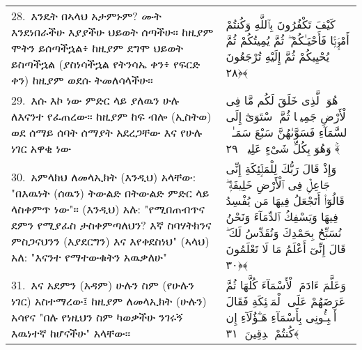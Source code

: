 \documentclass[11pt,a4paper,oneside]{article}%
\newcommand{\mytextarabic}[1]{\textarabic{ #1 \flushright}}
\begin{document}
\begin{longtable}{%
  @{}
    p{}
  @{~~~}
    p{}
    @{}
}
28.\ እንዴት በኣላህ አታምኑም? ሙት እንደነበራችሁ  እያያችሁ ህይወት ሰጣችሁ። ከዚያም ሞትን ይሰጣችኋል፥ ከዚያም ደግሞ ህይወት ይስጣችኋል (ያስነሳችኋል የትንሳኤ ቀን፥ የፍርድ ቀን) ከዚያም ወደሱ ትመለሳላችሁ። &  \mytextarabic{كَيْفَ تَكْفُرُونَ بِٱللَّهِ وَكُنتُمْ أَمْوَٟتًۭا فَأَحْيَـٰكُمْ ۖ ثُمَّ يُمِيتُكُمْ ثُمَّ يُحْيِيكُمْ ثُمَّ إِلَيْهِ تُرْجَعُونَ ﴿٢٨﴾}\\
29.\ እሱ እኮ ነው ምድር ላይ ያለዉን ሁሉ ለእናንተ የፈጠረው። ከዚያም ከፍ ብሎ (ኢስትወ) ወደ ሰማይ ሰባት ሰማያት አደረጋቸው እና የሁሉ  ነገር አዋቂ ነው &  \mytextarabic{هُوَ ٱلَّذِى خَلَقَ لَكُم مَّا فِى ٱلْأَرْضِ جَمِيعًۭا ثُمَّ ٱسْتَوَىٰٓ إِلَى ٱلسَّمَآءِ فَسَوَّىٰهُنَّ سَبْعَ سَمَـٰوَٟتٍۢ ۚ وَهُوَ بِكُلِّ شَىْءٍ عَلِيمٌۭ ﴿٢٩﴾}\\
30.\ አምላክህ ለመላኢክት (እንዲህ) አላቸው: "በእዉነት (ሰዉን) ትውልድ በትውልድ ምድር  ላይ ላስቀምጥ ነው"።  (እንዲህ) አሉ: "የሚበጠብጥና ደምን የሚያፈስ ታስቀምጣለህን? እኛ ስባሃትክንና  ምስጋናህንን (እያደርግን) እና እየቀደስነህ" (ኣላህ) አለ: "እናንተ የማተውቁትን አዉቃለሁ" &  \mytextarabic{وَإِذْ قَالَ رَبُّكَ لِلْمَلَٟٓئِكَةِ إِنِّى جَاعِلٌۭ فِى ٱلْأَرْضِ خَلِيفَةًۭ ۖ قَالُوٓا۟ أَتَجْعَلُ فِيهَا مَن يُفْسِدُ فِيهَا وَيَسْفِكُ ٱلدِّمَآءَ وَنَحْنُ نُسَبِّحُ بِحَمْدِكَ وَنُقَدِّسُ لَكَ ۖ قَالَ إِنِّىٓ أَعْلَمُ مَا لَا تَعْلَمُونَ ﴿٣٠﴾}\\
31.\ እና አደምን (አዳም) ሁሉን ስም (የሁሉን ነገር) አስተማረው፤ ከዚያም ለመላኢክት (ሁሉን) አሳየና "በሉ የነዚህን ስም ካወቃችሁ ንገሩኝ እዉነተኛ ከሆናችሁ" አላቸው። &  \mytextarabic{وَعَلَّمَ ءَادَمَ ٱلْأَسْمَآءَ كُلَّهَا ثُمَّ عَرَضَهُمْ عَلَى ٱلْمَلَٟٓئِكَةِ فَقَالَ أَنۢبِـُٔونِى بِأَسْمَآءِ هَـٰٓؤُلَآءِ إِن كُنتُمْ صَٟدِقِينَ ﴿٣١﴾}\\


\end{longtable}
\end{document}
